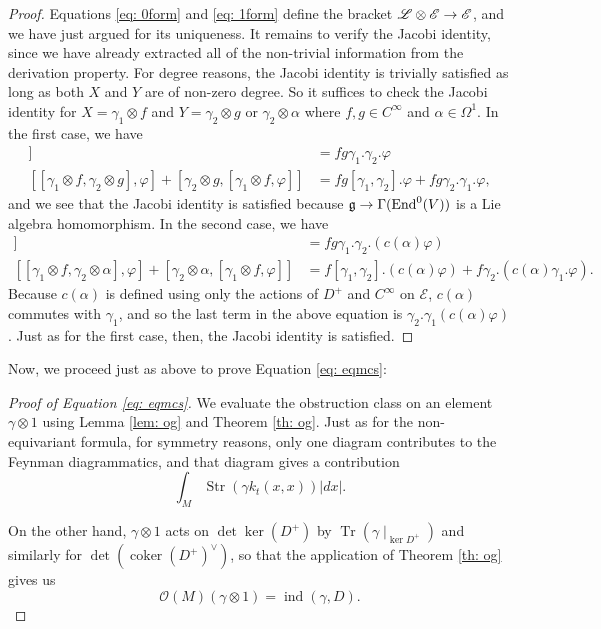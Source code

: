 \documentclass[11pt]{amsart}
\newcommand{\E}{\mscr{E}}
\newcommand{\mscr}{\mathscr}
\DeclareMathOperator{\Tr}{Tr} \DeclareMathOperator{\Cyc}{Cyc}
\numberwithin{equation}{section}
\newcommand{\cinfty}{C^{\infty}}
\newcommand\ind{\operatorname{ind}}
\newcommand\Str{\operatorname{Str}}
\newcommand\coker{\operatorname{coker}}
\begin{document}
\begin{proof}
Equations \ref{eq: 0form} and \ref{eq: 1form} define the bracket $\sL\otimes \E \to \E$, and we have just argued for its uniqueness. It remains to verify the Jacobi identity, since we have already extracted all of the non-trivial information from the derivation property. For degree reasons, the Jacobi identity is trivially satisfied as long as both $X$ and $Y$ are of non-zero degree. So it suffices to check the Jacobi identity for $X = \gamma_1 \otimes f$ and $Y= \gamma_2\otimes g$ or $\gamma_2 \otimes \alpha$ where $f,g\in \cinfty$ and $\alpha \in \Omega^1$. In the first case, we have
\begin{align*}
[\gamma_1\otimes f,[\gamma_2\otimes g,\varphi]]&=fg\gamma_1.\gamma_2.\varphi\\
[[\gamma_1\otimes f, \gamma_2 \otimes g],\varphi]+[\gamma_2\otimes g, [\gamma_1\otimes f, \varphi]]&=fg[\gamma_1,\gamma_2].\varphi + fg\gamma_2.\gamma_1.\varphi,
\end{align*}
and we see that the Jacobi identity is satisfied because $\mathfrak g\to \Gamma(\operatorname{End}^0(V))$ is a Lie algebra homomorphism. In the second case, we have
\begin{align*}
[\gamma_1\otimes f,[\gamma_2\otimes \alpha,\varphi]]&=fg\gamma_1.\gamma_2.(c(\alpha)\varphi)\\
[[\gamma_1\otimes f, \gamma_2 \otimes \alpha],\varphi]+[\gamma_2\otimes \alpha, [\gamma_1\otimes f, \varphi]]&=f[\gamma_1,\gamma_2].(c(\alpha)\varphi) + f\gamma_2.(c(\alpha)\gamma_1.\varphi).
\end{align*}
Because $c(\alpha)$ is defined using only the actions of $D^+$ and $\cinfty$ on $\E$, $c(\alpha)$ commutes with $\gamma_1$, and so the last term in the above equation is $\gamma_2.\gamma_1(c(\alpha)\varphi)$. Just as for the first case, then, the Jacobi identity is satisfied.
\end{proof}

Now, we proceed just as above to prove Equation \ref{eq: eqmcs}:
\begin{proof}[Proof of Equation \ref{eq: eqmcs}]
	We evaluate the obstruction class on an element $\gamma\otimes 1$ using Lemma \ref{lem: og} and Theorem \ref{th: og}.	Just as for the non-equivariant formula, for symmetry reasons, only one diagram contributes to the Feynman diagrammatics, and that diagram gives a contribution
\[
\int_M \Str(\gamma k_t(x,x))|dx|.
\]

On the other hand, $\gamma\otimes 1$ acts on $\det \ker (D^+)$ by $\Tr(\gamma\mid_{\ker D^+})$ and similarly for $\det (\coker(D^+)^\vee)$, so that the application of Theorem \ref{th: og} gives us 
\[
\mathcal O (M)(\gamma\otimes 1) = \ind(\gamma, D).
\] 
\end{proof}
\end{document}
